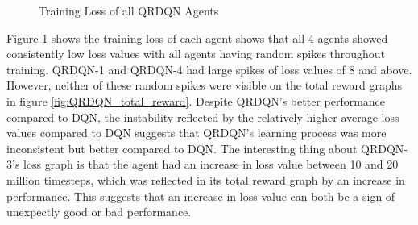 \begin{figure}[H]
    \centering
    \caption{Training Loss of all QRDQN Agents}
    \label{fig:QRDQN_training_loss}
\end{figure}

Figure \ref{fig:QRDQN_training_loss} shows the training loss of each agent shows that all 4 agents showed consistently low loss values with all agents having random spikes throughout training. QRDQN-1 and QRDQN-4 had large spikes of loss values of 8 and above. However, neither of these random spikes were visible on the total reward graphs in figure \ref{fig:QRDQN_total_reward}. Despite QRDQN's better performance compared to DQN, the instability reflected by the relatively higher average loss values compared to DQN suggests that QRDQN's learning process was more inconsistent but better compared to DQN. The interesting thing about QRDQN-3's loss graph is that the agent had an increase in loss value between 10 and 20 million timesteps, which was reflected in its total reward graph by an increase in performance. This suggests that an increase in loss value can both be a sign of unexpectly good or bad performance.

